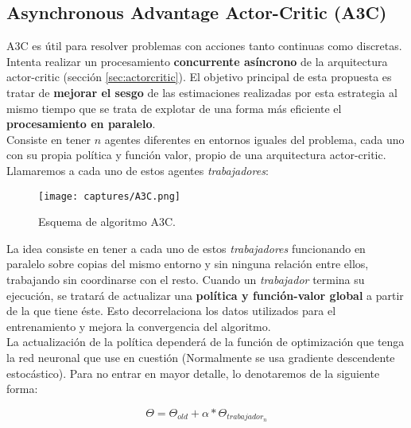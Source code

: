 \documentclass[11pt,fleqn]{book} %
\begin{document}
\subsection{Asynchronous Advantage Actor-Critic (A3C)}

A3C \cite{article:A2C} \cite{article:A3C} es útil para resolver problemas con acciones tanto continuas como discretas. Intenta realizar un procesamiento \textbf{concurrente asíncrono} de la arquitectura actor-critic (sección \ref{sec:actorcritic}). El objetivo principal de esta propuesta es tratar de \textbf{mejorar el sesgo} de las estimaciones realizadas por esta estrategia al mismo tiempo que se trata de explotar de una forma más eficiente el \textbf{procesamiento en paralelo}. \\

Consiste en tener $n$ agentes diferentes en entornos iguales del problema, cada uno con su propia política y función valor, propio de una arquitectura actor-critic. Llamaremos a cada uno de estos agentes \textit{trabajadores}:

\newpage

\begin{figure}[H]
	\centering\texttt{[image: captures/A3C.png]}
	\caption{Esquema de algoritmo A3C.}
	\label{fig:A3C} %
\end{figure}

La idea consiste en tener a cada uno de estos \textit{trabajadores} funcionando en paralelo sobre copias del mismo entorno y sin ninguna relación entre ellos, trabajando sin coordinarse con el resto. Cuando un \textit{trabajador} termina su ejecución, se tratará de actualizar una \textbf{política y función-valor global} a partir de la que tiene éste. Esto decorrelaciona los datos utilizados para el entrenamiento y mejora la convergencia del algoritmo. \\

La actualización de la política dependerá de la función de optimización que tenga la red neuronal que use en cuestión (Normalmente se usa gradiente descendente estocástico). Para no entrar en mayor detalle, lo denotaremos de la siguiente forma:

\begin{equation}
\Theta = \Theta_{old}+\alpha*\Theta_{trabajador_n}
\end{equation}
\end{document}
